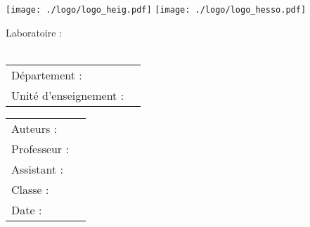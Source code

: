 \begin{center}
	\texttt{[image: ./logo/logo\_heig.pdf]}
	\hfill \texttt{[image: ./logo/logo\_hesso.pdf]}
\end{center}

\vfill

\begin{center}
	\Large Laboratoire \nbrLabo:\\
	\huge \titre \\
\end{center}


\begin{center}
	\begin{tabular}{l l}
		Département :          & \departement \\
		Unité d'enseignement : & \cours       \\
	\end{tabular}
\end{center}


\vfill


\begin{tabular}{l l}
	\Large Auteurs : & \Large \nomAuteur  \\
	Professeur :     & \prof              \\
	Assistant :      & \assistant         \\
	Classe :         & \classe            \\
	Date :           & \displaydate{date} \\
\end{tabular}

\thispagestyle{empty}
\setcounter{page}{1}